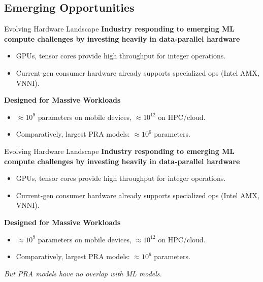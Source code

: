 \subsection{Emerging Opportunities}

\begin{frame}[t]{Evolving Hardware Landscape}
\textbf{Industry responding to emerging ML compute challenges by investing heavily in data-parallel hardware}
  \begin{itemize} 
    \item GPUs, tensor cores provide high throughput for integer operations.
    \item Current-gen consumer hardware already supports specialized ops (Intel AMX, VNNI).
  \end{itemize}
  \vspace{8pt}
\textbf{Designed for Massive Workloads}
  \begin{itemize} 
    \item $\approx10^9$ parameters on mobile devices, $\approx10^{12}$ on HPC/cloud.
    \item Comparatively, largest PRA models: $\approx10^6$ parameters.
  \end{itemize}
\end{frame}

\begin{frame}[t]{Evolving Hardware Landscape}
\textbf{Industry responding to emerging ML compute challenges by investing heavily in data-parallel hardware}
  \begin{itemize} 
    \item GPUs, tensor cores provide high throughput for integer operations.
    \item Current-gen consumer hardware already supports specialized ops (Intel AMX, VNNI).
  \end{itemize}
  \vspace{8pt}
\textbf{Designed for Massive Workloads}
  \begin{itemize} 
    \item $\approx10^9$ parameters on mobile devices, $\approx10^{12}$ on HPC/cloud.
    \item Comparatively, largest PRA models: $\approx10^6$ parameters.
  \end{itemize}
      \vspace{12pt}
  \textit{But PRA models have no overlap with ML models.}\\
\end{frame}


